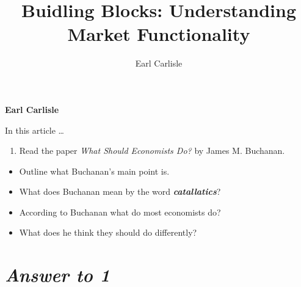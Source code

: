 \documentclass[11pt,]{article}
\title{Buidling Blocks: Understanding Market Functionality  }
\author{\Large Earl Carlisle\vspace{0.05in} \newline\normalsize\emph{}  }
\date{}
\newcommand*{\authorfont}{\fontfamily{phv}\selectfont}
\renewenvironment{abstract}
 {{%
    \setlength{\leftmargin}{0mm}
    \setlength{\rightmargin}{\leftmargin}%
  }%
  \relax}
 {\endlist}
\begin{document}
	
%

{%
\setlength{\parindent}{0pt}
\thispagestyle{plain}
{\fontsize{18}{20}\selectfont\raggedright 
\maketitle  %

}

{
   \vskip 13.5pt\relax \normalsize\fontsize{11}{12} 
\textbf{\authorfont Earl Carlisle} \hskip 15pt \emph{\small }   

}

}







\begin{abstract}

    \hbox{\vrule height .2pt width 39.14pc}

    \vskip 8.5pt %

\noindent In this article \ldots{}


    \hbox{\vrule height .2pt width 39.14pc}


\end{abstract}


\vskip 6.5pt

\noindent \doublespacing \begin{enumerate}
\def\labelenumi{\arabic{enumi}.}
\tightlist
\item
  Read the paper \emph{What Should Economists Do?} by James M. Buchanan.
\end{enumerate}

\begin{itemize}
\tightlist
\item
  Outline what Buchanan's main point is.
\item
  What does Buchanan mean by the word \textbf{\emph{catallatics}}?
\item
  According to Buchanan what do most economists do?
\item
  What does he think they should do differently?
\end{itemize}

\section{\texorpdfstring{\emph{Answer to
1}}{Answer to 1}}\label{answer-to-1}
\end{document}
